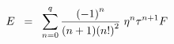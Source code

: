 \begin{equation}
E \;\; = \;\; \sum_{n=0}^{q} {{(-1)}^n \over (n+1){(n!)}^2} \; \eta^n \tau^{n+1} F
\label{eq:x2}
\end{equation}


